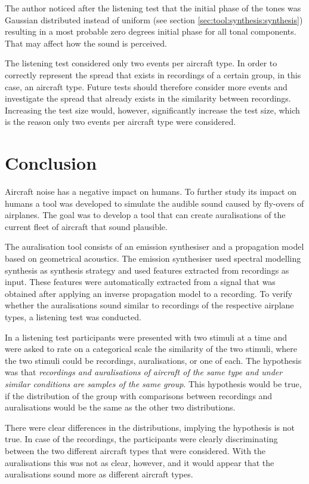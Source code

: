 \documentclass[10pt,twocolumn]{article}
\begin{document}
The author noticed after the listening test that the initial phase of the tones
was Gaussian distributed instead of uniform (see section
\ref{sec:tool:synthesis:synthesis}) resulting in a most probable zero degrees
initial phase for all tonal components. That may affect how the sound is
perceived.

The listening test considered only two events per aircraft type. In order to
correctly represent the spread that exists in recordings of a certain group, in
this case, an aircraft type. Future tests should therefore consider more events
and investigate the spread that already exists in the similarity between
recordings. Increasing the test size would, however, significantly increase the
test size, which is the reason only two events per aircraft type were
considered.


\section{Conclusion}
Aircraft noise has a negative impact on humans. To further study its impact on
humans a tool was developed to simulate the audible sound caused by
fly-overs of airplanes. The goal was to develop a tool that can create
auralisations of the current fleet of aircraft that sound plausible.

The auralisation tool consists of an emission synthesiser and a propagation
model based on geometrical acoustics. The emission synthesiser used spectral
modelling synthesis as synthesis strategy and used features extracted from
recordings as input. These features were automatically extracted from a signal
that was obtained after applying an inverse propagation model to a recording.
To verify whether the auralisations sound similar to recordings of the
respective airplane types, a listening test was conducted.

In a listening test participants were presented with two stimuli
at a time and were asked to rate on a categorical scale the similarity of the two stimuli,
where the two stimuli could be recordings, auralisations, or one of each. The
hypothesis was that \emph{recordings and auralisations of aircraft of the same
type and under similar conditions are samples of the same group}. This
hypothesis would be true, if the distribution of the group with comparisons
between recordings and auralisations would be the same as the other two
distributions.

There were clear differences in the distributions, implying the hypothesis is
not true. In case of the recordings, the participants were clearly discriminating
between the two different aircraft types that were considered. With the
auralisations this was not as clear, however, and it would appear that the
auralisations sound more as different aircraft types.
\end{document}
